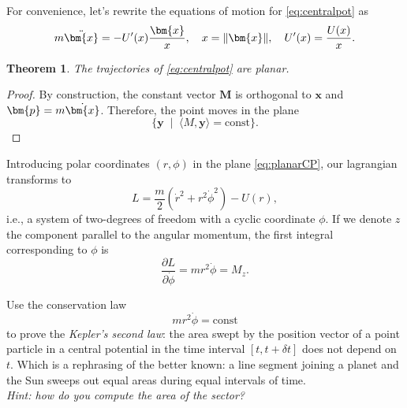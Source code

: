 \documentclass[english,fontsize=11pt,paper=a5,oneside]{scrbook}
\newcommand{\bx}{\bm{x}}
\newcommand{\bp}{\bm{p}}
\newcommand{\lag}{\langle}
\newcommand{\rag}{\rangle}
\let\d\relax
\newcommand{\d}{\mathrm{d}}
\newtheorem{theorem}{Theorem}[chapter]
\theoremstyle{definition}
\newenvironment{exercise}
  {\pushQED{\qed}\renewcommand{\qedsymbol}{$\maltese$}\exercisex}
  {\popQED\endexercisex}
\begin{document}
For convenience, let's rewrite the equations of motion for \eqref{eq:centralpot} as
\begin{equation}
  m\ddot \bx = - U'(x)\frac{\bx}{x}, \quad x = \|\bx\|, \quad U'(x)=\frac{\d U(x)}{\d x}.
\end{equation}

\begin{theorem}
  The trajectories of \eqref{eq:centralpot} are planar.
\end{theorem}
\begin{proof}
  By construction, the constant vector $\bm{M}$ is orthogonal to $\bx$ and $\bp = m \dot \bx$.
  Therefore, the point moves in the plane
  \begin{equation}\label{eq:planarCP}
    \{\mathbf{y} \;\mid\; \lag M, \mathbf{y}\rag = \mathrm{const} \}.
  \end{equation}
\end{proof}

Introducing polar coordinates $(r,\phi)$ in the plane \eqref{eq:planarCP}, our lagrangian transforms to
\begin{equation}
  L = \frac{m}{2} \left(\dot r^2 + r^2 \dot \phi^2\right) - U(r),
\end{equation}
i.e., a system of two-degrees of freedom with a cyclic coordinate $\phi$.
If we denote $z$ the component parallel to the angular momentum, the first integral corresponding to $\phi$ is
\begin{equation}\label{eq:cyclicphi}
  \frac{\partial L}{\partial \dot \phi} = m r^2 \dot \phi = M_z.
\end{equation}

\begin{exercise}
  Use the conservation law
  \begin{equation}
    m r^2 \dot \phi = \mathrm{const}
  \end{equation}
  to prove the \emph{Kepler's second law}: the area swept by the position vector of a point particle in a central potential in the time interval $[t, t+\delta t]$ does not depend on $t$. Which is a rephrasing of the better known: a line segment joining a planet and the Sun sweeps out equal areas during equal intervals of time.\\
  \textit{Hint: how do you compute the area of the sector?}
\end{exercise}
\end{document}
